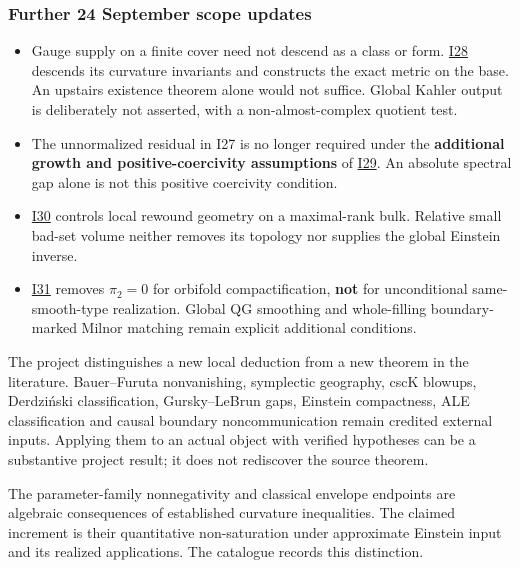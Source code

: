 \documentclass[
  10pt,
]{article}
\providecommand{\tightlist}{%
  \setlength{\itemsep}{0pt}\setlength{\parskip}{0pt}}
\begin{document}
\hypertarget{further-24-september-scope-updates}{%
\subsubsection{Further 24 September scope
updates}\label{further-24-september-scope-updates}}

\begin{itemize}
\tightlist
\item
  Gauge supply on a finite cover need not descend as a class or form.
  \href{../continuation/20260924_virtual_gauge_realization.md}{I28}
  descends its curvature invariants and constructs the exact metric on
  the base. An upstairs existence theorem alone would not suffice.
  Global Kahler output is deliberately not asserted, with a
  non-almost-complex quotient test.
\item
  The unnormalized residual in I27 is no longer required under the
  \textbf{additional growth and positive-coercivity assumptions} of
  \href{../continuation/20260924_uniformly_local_repair.md}{I29}. An
  absolute spectral gap alone is not this positive coercivity condition.
\item
  \href{../continuation/20260924_collapsed_bilateral_bulk.md}{I30}
  controls local rewound geometry on a maximal-rank bulk. Relative small
  bad-set volume neither removes its topology nor supplies the global
  Einstein inverse.
\item
  \href{../continuation/20260924_orbifold_smoothing_bridge.md}{I31}
  removes \(\pi_2=0\) for orbifold compactification, \textbf{not} for
  unconditional same-smooth-type realization. Global QG smoothing and
  whole-filling boundary-marked Milnor matching remain explicit
  additional conditions.
\end{itemize}

The project distinguishes a new local deduction from a new theorem in
the literature. Bauer--Furuta nonvanishing, symplectic geography, cscK
blowups, Derdziński classification, Gursky--LeBrun gaps, Einstein
compactness, ALE classification and causal boundary noncommunication
remain credited external inputs. Applying them to an actual object with
verified hypotheses can be a substantive project result; it does not
rediscover the source theorem.

The parameter-family nonnegativity and classical envelope endpoints are
algebraic consequences of established curvature inequalities. The
claimed increment is their quantitative non-saturation under approximate
Einstein input and its realized applications. The catalogue records this
distinction.
\end{document}
